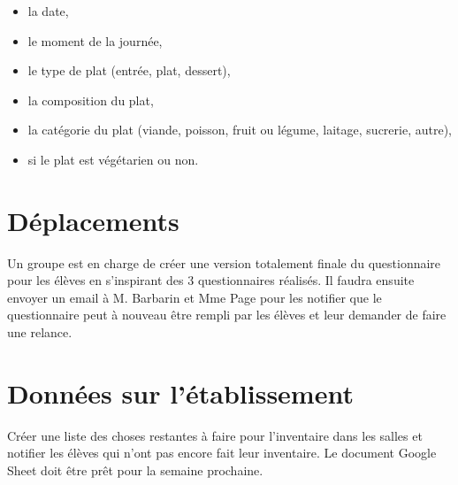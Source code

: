 \documentclass{exam}
\begin{document}
\begin{itemize}[itemsep=1pt, topsep=2pt, parsep=0pt]
    \item la date,
    \item le moment de la journée,
    \item le type de plat (entrée, plat, dessert),
    \item la composition du plat,
    \item la catégorie du plat (viande, poisson, fruit ou légume, laitage, sucrerie, autre),
    \item si le plat est végétarien ou non.
\end{itemize}

\section*{Déplacements}

Un groupe est en charge de créer une version totalement finale du questionnaire pour les élèves en s'inspirant des 3 questionnaires réalisés. Il faudra ensuite envoyer un email à M. Barbarin et Mme Page pour les notifier que le questionnaire peut à nouveau être rempli par les élèves et leur demander de faire une relance.

\section*{Données sur l'établissement}

Créer une liste des choses restantes à faire pour l'inventaire dans les salles et notifier les élèves qui n'ont pas encore fait leur inventaire. Le document Google Sheet doit être prêt pour la semaine prochaine. 
\end{document}
